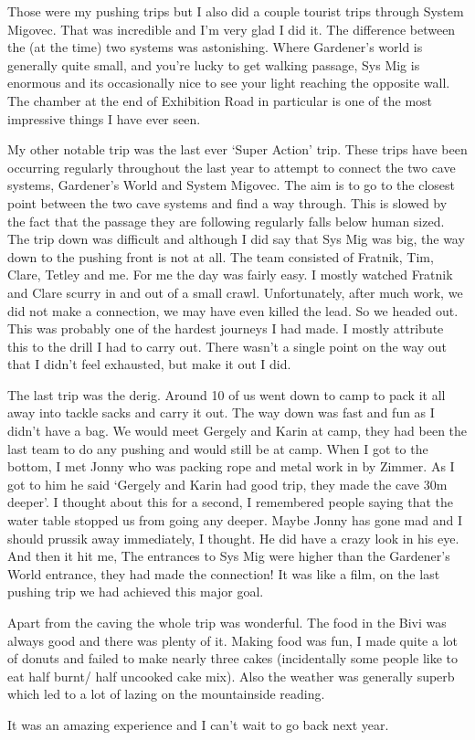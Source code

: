 Those were my pushing trips but I also did a couple tourist trips through System Migovec. That was incredible and I’m very glad I did it. The difference between the (at the time) two systems was astonishing. Where Gardener’s world is generally quite small, and you’re lucky to get walking passage, Sys Mig is enormous and its occasionally nice to see your light reaching the opposite wall. The chamber at the end of Exhibition Road in particular is one of the most impressive things I have ever seen.

My other notable trip was the last ever ‘Super Action’ trip. These trips have been occurring regularly throughout the last year to attempt to connect the two cave systems, Gardener’s World and System Migovec. The aim is to go to the closest point between the two cave systems and find a way through. This is slowed by the fact that the passage they are following regularly falls below human sized. The trip down was difficult and although I did say that Sys Mig was big, the way down to the pushing front is not at all. The team consisted of Fratnik, Tim, Clare, Tetley and me. For me the day was fairly easy. I mostly watched Fratnik and Clare scurry in and out of a small crawl. Unfortunately, after much work, we did not make a connection, we may have even killed the lead. So we headed out. This was probably one of the hardest journeys I had made. I mostly attribute this to the drill I had to carry out. There wasn’t a single point on the way out that I didn’t feel exhausted, but make it out I did.

The last trip was the derig. Around 10 of us went down to camp to pack it all away into tackle sacks and carry it out. The way down was fast and fun as I didn’t have a bag. We would meet Gergely and Karin at camp, they had been the last team to do any pushing and would still be at camp. When I got to the bottom, I met Jonny who was packing rope and metal work in by Zimmer. As I got to him he said ‘Gergely and Karin had good trip, they made the cave 30m deeper’. I thought about this for a second, I remembered people saying that the water table stopped us from going any deeper. Maybe Jonny has gone mad and I should prussik away immediately, I thought. He did have a crazy look in his eye. And then it hit me, The entrances to Sys Mig were higher than the Gardener’s World entrance, they had made the connection! It was like a film, on the last pushing trip we had achieved this major goal.

Apart from the caving the whole trip was wonderful. The food in the Bivi was always good and there was plenty of it. Making food was fun, I made quite a lot of donuts and failed to make nearly three cakes (incidentally some people like to eat half burnt/ half uncooked cake mix). Also the weather was generally superb which led to a lot of lazing on the mountainside reading.

It was an amazing experience and I can’t wait to go back next year.